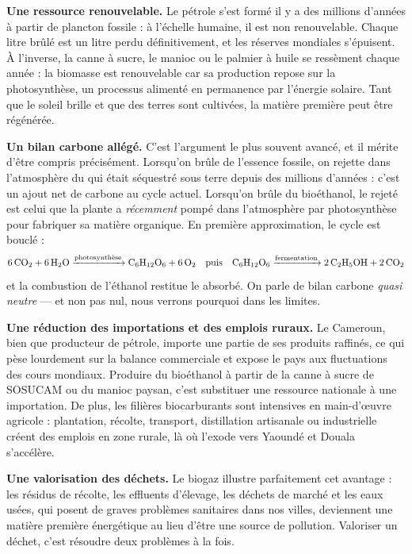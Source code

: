 \documentclass[11pt]{article}
\newcommand{\cle}[1]{{\popxbold\color{popdark}#1}}
\begin{document}
\textbf{Une ressource renouvelable.} Le pétrole s'est formé il y a des millions d'années à partir de plancton fossile : à l'échelle humaine, il est \cle{non renouvelable}. Chaque litre brûlé est un litre perdu définitivement, et les réserves mondiales s'épuisent. À l'inverse, la canne à sucre, le manioc ou le palmier à huile se ressèment chaque année : la biomasse est \cle{renouvelable} car sa production repose sur la photosynthèse, un processus alimenté en permanence par l'énergie solaire. Tant que le soleil brille et que des terres sont cultivées, la matière première peut être régénérée.

\textbf{Un bilan carbone allégé.} C'est l'argument le plus souvent avancé, et il mérite d'être compris précisément. Lorsqu'on brûle de l'essence fossile, on rejette dans l'atmosphère du  qui était séquestré sous terre depuis des millions d'années : c'est un ajout net de carbone au cycle actuel. Lorsqu'on brûle du bioéthanol, le  rejeté est celui que la plante a \emph{récemment} pompé dans l'atmosphère par photosynthèse pour fabriquer sa matière organique. En première approximation, le cycle est bouclé :
\[
\ce{6CO2 + 6H2O ->[$\text{photosynthèse}$] C6H12O6 + 6O2} \quad\text{puis}\quad \ce{C6H12O6 ->[$\text{fermentation}$] 2C2H5OH + 2CO2}
\]
et la combustion de l'éthanol restitue le  absorbé. On parle de bilan carbone \emph{quasi neutre} — et non pas nul, nous verrons pourquoi dans les limites.

\textbf{Une réduction des importations et des emplois ruraux.} Le Cameroun, bien que producteur de pétrole, importe une partie de ses produits raffinés, ce qui pèse lourdement sur la balance commerciale et expose le pays aux fluctuations des cours mondiaux. Produire du bioéthanol à partir de la canne à sucre de SOSUCAM ou du manioc paysan, c'est substituer une ressource nationale à une importation. De plus, les filières biocarburants sont intensives en main-d'œuvre agricole : plantation, récolte, transport, distillation artisanale ou industrielle créent des emplois en zone rurale, là où l'exode vers Yaoundé et Douala s'accélère.

\textbf{Une valorisation des déchets.} Le biogaz illustre parfaitement cet avantage : les résidus de récolte, les effluents d'élevage, les déchets de marché et les eaux usées, qui posent de graves problèmes sanitaires dans nos villes, deviennent une matière première énergétique au lieu d'être une source de pollution. Valoriser un déchet, c'est résoudre deux problèmes à la fois.
\end{document}
